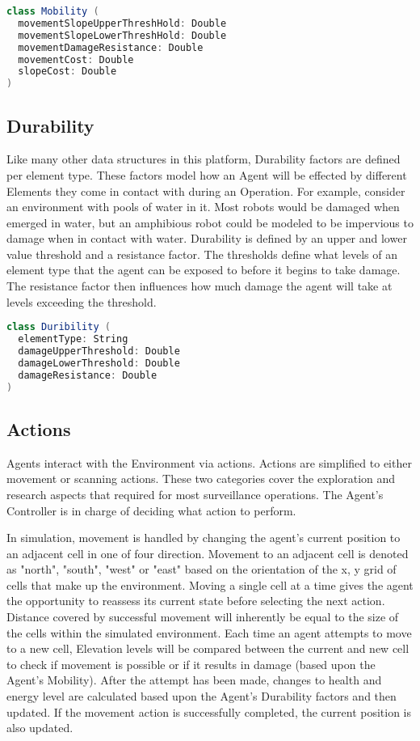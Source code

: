 \begin{lstlisting}[language=Scala]
class Mobility (
  movementSlopeUpperThreshHold: Double
  movementSlopeLowerThreshHold: Double
  movementDamageResistance: Double
  movementCost: Double
  slopeCost: Double
)
\end{lstlisting}

\subsection{Durability}
Like many other data structures in this platform, Durability factors are defined per element type.
These factors model how an Agent will be effected by different Elements they come in contact with during an Operation.
For example, consider an environment with pools of water in it.
Most robots would be damaged when emerged in water, but an amphibious robot could be modeled to be impervious to damage when in contact with water.
Durability is defined by an upper and lower value threshold and a resistance factor.
The thresholds define what levels of an element type that the agent can be exposed to before it begins to take damage.
The resistance factor then influences how much damage the agent will take at levels exceeding the threshold.

\begin{lstlisting}[language=Scala]
class Duribility (
  elementType: String
  damageUpperThreshold: Double
  damageLowerThreshold: Double
  damageResistance: Double
)
\end{lstlisting}


\subsection{Actions}
Agents interact with the Environment via actions.
Actions are simplified to either movement or scanning actions.
These two categories cover the exploration and research aspects that required for most surveillance operations.
The Agent's Controller is in charge of deciding what action to perform.

In simulation, movement is handled by changing the agent's current position to an adjacent cell in one of four direction.
Movement to an adjacent cell is denoted as "north", "south", "west" or "east" based on the orientation of the x, y grid of cells that make up the environment. 
Moving a single cell at a time gives the agent the opportunity to reassess its current state before selecting the next action.
Distance covered by successful movement will inherently be equal to the size of the cells within the simulated environment.
Each time an agent attempts to move to a new cell, Elevation levels will be compared between the current and new cell to check if movement is possible or if it results in damage (based upon the Agent's Mobility).
After the attempt has been made, changes to health and energy level are calculated based upon the Agent's Durability factors and then updated.
If the movement action is successfully completed, the current position is also updated.

